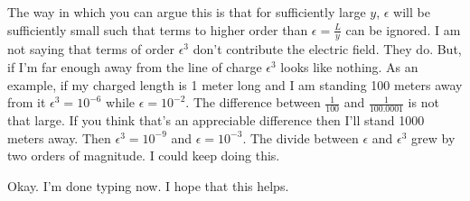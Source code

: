 \begin{homeworkProblem}[Problem 23.42]
The way in which you can argue this is that for sufficiently large $y$,
$\epsilon$ will be sufficiently small such that terms to higher order
than $\epsilon = \frac{L}{y}$ can be ignored. I am not saying that terms
of order $\epsilon^3$ don't contribute the electric field. They do. But,
if I'm far enough away from the line of charge $\epsilon^3$ looks like
nothing. As an example, if my charged length is 1 meter long and I am
standing 100 meters away from it $\epsilon^3 = 10^ {-6}$ while $\epsilon
= 10^{-2}$. The difference between $\frac{1}{100}$ and
$\frac{1}{100.0001}$ is not that large. If you think that's an
appreciable difference then I'll stand 1000 meters away. Then
$\epsilon^3 = 10^{-9}$ and $\epsilon = 10^{-3}$. The divide between
$\epsilon$ and $\epsilon^3$ grew by two orders of magnitude. I could
keep doing this.

Okay. I'm done typing now. I hope that this helps.

\end{homeworkProblem}
